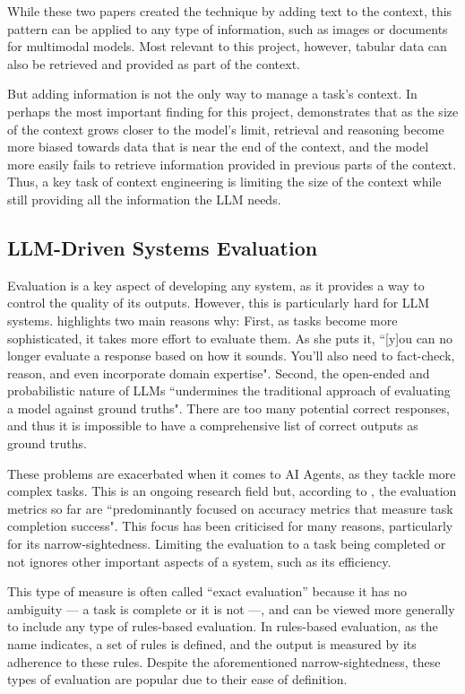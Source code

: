 \documentclass[a4paper]{report}
\begin{document}
While these two papers created the technique by adding text to the context, this pattern can be applied to any type of information, such as images or documents for multimodal models. Most relevant to this project, however, tabular data can also be retrieved and provided as part of the context.

But adding information is not the only way to manage a task's context. In perhaps the most important finding for this project, \cite{veseli2025positionalbiasesshiftinputs} demonstrates that as the size of the context grows closer to the model's limit, retrieval and reasoning become more biased towards data that is near the end of the context, and the model more easily fails to retrieve information provided in previous parts of the context. Thus, a key task of context engineering is limiting the size of the context while still providing all the information the LLM needs.

\subsection{LLM-Driven Systems Evaluation}
\label{sec:llm-evaluation}

Evaluation is a key aspect of developing any system, as it provides a way to control the quality of its outputs. However, this is particularly hard for LLM systems. \cite{aiebook2025} highlights two main reasons why: First, as tasks become more sophisticated, it takes more effort to evaluate them. As she puts it, ``[y]ou can no longer evaluate a response based on how it sounds. You'll also need to fact-check, reason, and even incorporate domain expertise". Second, the open-ended and probabilistic nature of LLMs ``undermines the traditional approach of evaluating a model against ground truths". There are too many potential correct responses, and thus it is impossible to have a comprehensive list of correct outputs as ground truths.

These problems are exacerbated when it comes to AI Agents, as they tackle more complex tasks. This is an ongoing research field but, according to \cite{krishnan2025aiagentsevolutionarchitecture}, the evaluation metrics so far are ``predominantly focused on accuracy metrics that measure task completion success". This focus has been criticised for many reasons, particularly for its narrow-sightedness. Limiting the evaluation to a task being completed or not ignores other important aspects of a system, such as its efficiency.

This type of measure is often called ``exact evaluation'' because it has no ambiguity --- a task is complete or it is not ---, and can be viewed more generally to include any type of rules-based evaluation. In rules-based evaluation, as the name indicates, a set of rules is defined, and the output is measured by its adherence to these rules. Despite the aforementioned narrow-sightedness, these types of evaluation are popular due to their ease of definition.
\end{document}
